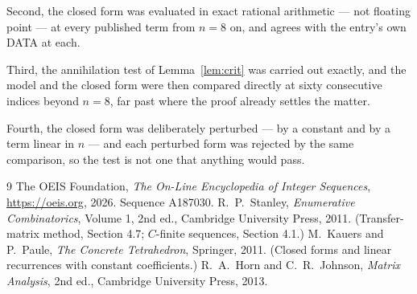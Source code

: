 \documentclass[11pt,a4paper]{article}
\theoremstyle{plain}
\theoremstyle{definition}
\begin{document}
Second, the closed form was evaluated in exact rational arithmetic --- not floating point ---
at every published term from $n=8$ on, and agrees with the entry's own DATA at each.

Third, the annihilation test of Lemma~\ref{lem:crit} was carried out exactly, and the model
and the closed form were then compared directly at sixty consecutive indices beyond
$n=8$, far past where the proof already settles the matter.

Fourth, the closed form was deliberately perturbed --- by a constant and by a term linear in
$n$ --- and each perturbed form was rejected by the same comparison, so the test is not one
that anything would pass.

\begin{thebibliography}{9}
 The OEIS Foundation, \emph{The On-Line Encyclopedia of Integer
Sequences}, \url{https://oeis.org}, 2026. Sequence A187030.
 R.~P.~Stanley, \emph{Enumerative Combinatorics}, Volume 1, 2nd ed.,
Cambridge University Press, 2011. (Transfer-matrix method, Section 4.7; $C$-finite sequences,
Section 4.1.)
 M.~Kauers and P.~Paule, \emph{The Concrete Tetrahedron}, Springer, 2011.
(Closed forms and linear recurrences with constant coefficients.)
 R.~A.~Horn and C.~R.~Johnson, \emph{Matrix Analysis}, 2nd ed., Cambridge
University Press, 2013.
\end{thebibliography}
\end{document}
